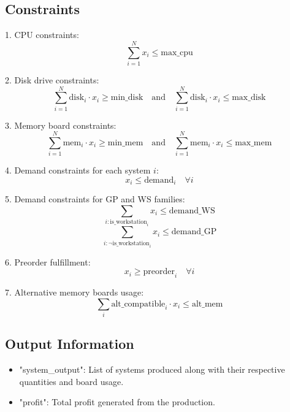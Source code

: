 \documentclass{article}
\begin{document}
\subsection*{Constraints}
1. CPU constraints:
\[
\sum_{i=1}^{N} x_i \leq \text{max\_cpu}
\]

2. Disk drive constraints:
\[
\sum_{i=1}^{N} \text{disk}_i \cdot x_i \geq \text{min\_disk} \quad \text{and} \quad \sum_{i=1}^{N} \text{disk}_i \cdot x_i \leq \text{max\_disk}
\]

3. Memory board constraints:
\[
\sum_{i=1}^{N} \text{mem}_i \cdot x_i \geq \text{min\_mem} \quad \text{and} \quad \sum_{i=1}^{N} \text{mem}_i \cdot x_i \leq \text{max\_mem}
\]

4. Demand constraints for each system \( i \):
\[
x_i \leq \text{demand}_i \quad \forall i
\]

5. Demand constraints for GP and WS families:
\[
\sum_{i: \text{is\_workstation}_i} x_i \leq \text{demand\_WS}
\]
\[
\sum_{i: \neg \text{is\_workstation}_i} x_i \leq \text{demand\_GP}
\]

6. Preorder fulfillment:
\[
x_i \geq \text{preorder}_i \quad \forall i
\]

7. Alternative memory boards usage:
\[
\sum_{i} \text{alt\_compatible}_i \cdot x_i \leq \text{alt\_mem}
\]

\subsection*{Output Information}
\begin{itemize}
    \item "system\_output": List of systems produced along with their respective quantities and board usage.
    \item "profit": Total profit generated from the production.
\end{itemize}
\end{document}
